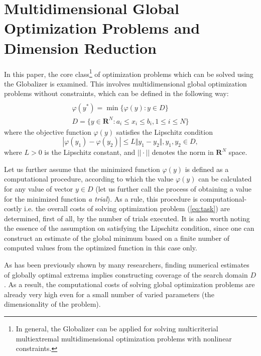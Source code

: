 \documentclass{gOMS2e}
\theoremstyle{plain}%
\theoremstyle{definition}
\theoremstyle{remark}
\begin{document}
\section{Multidimensional Global Optimization Problems and Dimension Reduction}
\label{sec:problem}
In this paper, the core class\footnote{In general, the Globalizer can be applied for solving
multicriterial multiextremal multidimensional optimization problems with nonlinear constraints.} of
optimization problems which can be solved using the
Globalizer is examined. This involves multidimensional global optimization problems
without constraints, which can be defined in the following way:
\begin{equation}
\label{eq:task}
\begin{array}{cr}\\
  \varphi(y^*)=\min\{\varphi(y):y\in D\} \\
  D=\{y\in \mathbf{R}^N:a_i\leqslant x_i\leqslant{b_i}, 1\leqslant{i}\leqslant{N}\}
\end{array}
\end{equation}
where the objective function \(\varphi(y)\) satisfies the Lipschitz condition
\begin{equation}
\label{eq:lip}
|\varphi(y_1)-\varphi(y_2)|\leqslant L\Vert y_1-y_2\Vert,y_1,y_2\in D,
\end{equation}
where \(L>0\) is the Lipschitz constant, and \(||\cdot||\) denotes the norm in \(\mathbf{R}^N\) space.
\par
Let us further assume that the minimized function \(\varphi(y)\) is defined as a
computational procedure, according to which the value \(\varphi(y)\) can be calculated
for any value of vector \(y\in D\) (let us further call the process of obtaining a
value for the minimized function \textit{a trial}). As a rule, this procedure is computational-costly i.e.
the overall costs of solving optimization problem (\ref{eq:task}) are determined,
first of all, by the number of trials executed. It is also worth noting the essence of the
assumption on satisfying the Lipschitz condition, since one can construct an estimate
of the global minimum based on a finite number of computed values from the optimized function in this case only.
\par
As has been previously shown by many researchers, finding numerical estimates of globally
optimal extrema implies constructing coverage of the search domain \(D\). As a result,
the computational costs of solving global optimization problems are already very high
even for a small number of varied parameters (the dimensionality of the problem).
\end{document}
